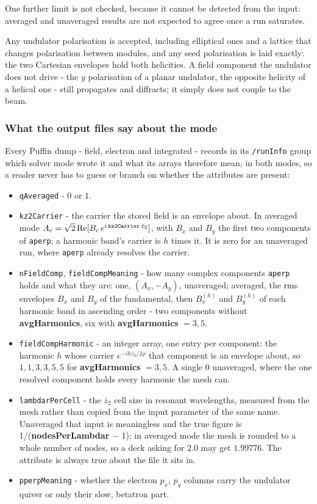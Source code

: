 \documentclass[12pt]{article}%
\begin{document}
One further limit is not checked, because it cannot be detected from the input: averaged and unaveraged results are not expected to agree once a run saturates.

Any undulator polarisation is accepted, including elliptical ones and a lattice that changes polarisation between modules, and any seed polarisation is laid exactly: the two Cartesian envelopes hold both helicities. A field component the undulator does not drive - the $y$ polarisation of a planar undulator, the opposite helicity of a helical one - still propagates and diffracts; it simply does not couple to the beam.

\subsubsection{What the output files say about the mode}

Every Puffin dump - field, electron and integrated - records in its {\tt /runInfo} group which solver mode wrote it and what its arrays therefore mean, in both modes, so a reader never has to guess or branch on whether the attributes are present:

\begin{itemize}
\item {\tt qAveraged} - $0$ or $1$.
\item {\tt kz2Carrier} - the carrier the stored field is an envelope about. In averaged mode $A_c = \sqrt{2}\,\mathrm{Re}[B_c\, e^{i\,{\tt kz2Carrier}\,\bar{z}_2}]$, with $B_x$ and $B_y$ the first two components of {\tt aperp}; a harmonic band's carrier is $h$ times it. It is zero for an unaveraged run, where {\tt aperp} already resolves the carrier.
\item {\tt nFieldComp}, {\tt fieldCompMeaning} - how many complex components {\tt aperp} holds and what they are: one, $(A_x, -A_y)$, unaveraged; averaged, the rms envelopes $B_x$ and $B_y$ of the fundamental, then $B^{(h)}_x$ and $B^{(h)}_y$ of each harmonic band in ascending order - two components without {\bf avgHarmonics}, six with {\bf avgHarmonics} $= 3, 5$.
\item {\tt fieldCompHarmonic} - an integer array, one entry per component: the harmonic $h$ whose carrier $e^{-ih\bar{z}_2/2\rho}$ that component is an envelope about, so $1, 1, 3, 3, 5, 5$ for {\bf avgHarmonics} $= 3, 5$. A single $0$ unaveraged, where the one resolved component holds every harmonic the mesh can.
\item {\tt lambdarPerCell} - the $\bar{z}_2$ cell size in resonant wavelengths, measured from the mesh rather than copied from the input parameter of the same name. Unaveraged that input is meaningless and the true figure is 1/({\bf nodesPerLambdar} $-$ 1); in averaged mode the mesh is rounded to a whole number of nodes, so a deck asking for $2.0$ may get $1.99776$. The attribute is always true about the file it sits in.
\item {\tt pperpMeaning} - whether the electron $p_x$, $p_y$ columns carry the undulator quiver or only their slow, betatron part.
\end{itemize}
\end{document}
